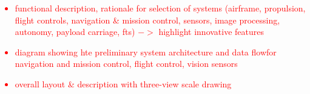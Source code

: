 \textcolor{red}{
\begin{itemize}
	\item
	      functional description, rationale for selection of systems (airframe, propulsion, flight controls, navigation \& mission control, sensors, image processing, autonomy, payload carriage, fts) $->$ highlight innovative features
	\item
	      diagram showing hte preliminary system architecture and data flowfor navigation and mission control, flight control, vision sensors
	\item
		overall layout \& description with three-view scale drawing
\end{itemize}
}

